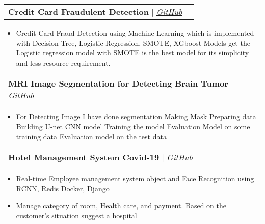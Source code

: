 \documentclass[letterpaper,11pt]{article}
\makeatletter
\newcommand{\resumeItem}[1]{
  \item\small{
    {#1 \vspace{-2pt}}
  }
}
\newcommand{\resumeProjectHeading}[2]{
    \vspace{-2pt}\item
    \begin{tabular*}{0.97\textwidth}{l@{\extracolsep{\fill}}r}
      \small#1 & #2 \\
    \end{tabular*}\vspace{-7pt}
}
\newcommand{\resumeItemListStart}{\begin{itemize}}
\newcommand{\resumeItemListEnd}{\end{itemize}\vspace{-5pt}}
\makeatother
\begin{document}
{      \resumeProjectHeading
        {\textbf{Credit Card Fraudulent Detection} $|$ \emph{\href{https://github.com/saifulislamsarfaraz/Credit-Card-Fraud-Detection-with-Matchine-learning}{\color{blue}GitHub}}}{}
          \resumeItemListStart
            \resumeItem{Credit Card Fraud Detection using Machine Learning which is implemented with Decision Tree, Logistic Regression, SMOTE, XGboost Models get the Logistic regression model with SMOTE is the best model for its simplicity and less resource requirement.}
          \resumeItemListEnd
                \resumeProjectHeading
        {\textbf{MRI Image Segmentation for Detecting Brain Tumor} $|$ \emph{\href{https://github.com/saifulislamsarfaraz/brain-tumor-detection}{\color{blue}GitHub}}}{}
          \resumeItemListStart
            \resumeItem{For Detecting Image I have done segmentation Making Mask Preparing data Building U-net CNN model Training the model Evaluation Model on some training data Evaluation model on the test data}
            \resumeItemListEnd
      \resumeProjectHeading
        {\textbf{Hotel Management System Covid-19} $|$ \emph{\href{https://github.com/saifulislamsarfaraz/The-hotel-management-system-Covid-19}{\color{blue}GitHub}}}{}
          \resumeItemListStart
            \resumeItem{Real-time Employee management system object and Face Recognition using RCNN, Redis Docker, Django}
            \resumeItem{Manage category of room, Health care, and payment. Based on the customer's situation suggest a hospital}
          \resumeItemListEnd
      
      
      
}
\end{document}
